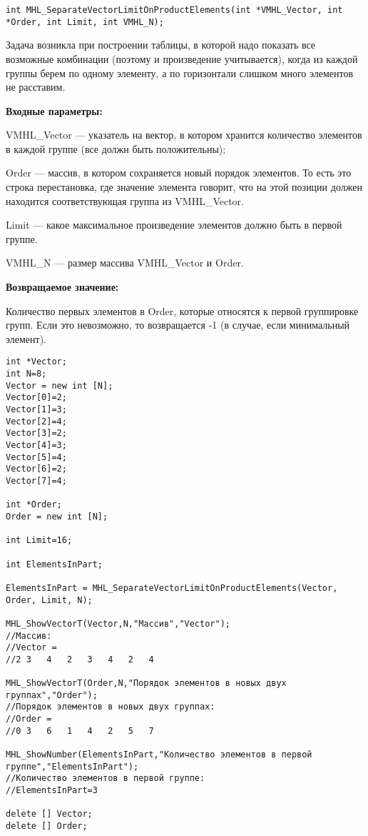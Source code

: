 \documentclass[a4paper,12pt]{article}
\begin{document}
\begin{lstlisting}[label=code_syntax_MHL_SeparateVectorLimitOnProductElements,caption=Синтаксис]
int MHL_SeparateVectorLimitOnProductElements(int *VMHL_Vector, int *Order, int Limit, int VMHL_N);
\end{lstlisting}

Задача возникла при построении таблицы, в которой надо показать все возможные комбинации (поэтому и произведение учитывается), когда из каждой группы берем по одному элементу, а по горизонтали слишком много элементов не расставим.

\textbf{Входные параметры:}  
 
VMHL\_Vector --- указатель на вектор, в котором хранится количество элементов в каждой группе (все должн быть положительны);
 
Order --- массив, в котором сохраняется новый порядок элементов. То есть это строка перестановка, где значение элемента говорит, что на этой позиции должен находится соответствующая группа из VMHL\_Vector.
 
Limit --- какое максимальное произведение элементов должно быть в первой группе.
 
VMHL\_N --- размер массива VMHL\_Vector и Order.
 
\textbf{Возвращаемое значение:}

Количество первых элементов в Order, которые относятся к первой группировке групп. Если это невозможно, то возвращается -1 (в случае, если минимальный элемент).



\begin{lstlisting}[label=code_use_MHL_SeparateVectorLimitOnProductElements,caption=Пример использования]
int *Vector;
int N=8;
Vector = new int [N];
Vector[0]=2;
Vector[1]=3;
Vector[2]=4;
Vector[3]=2;
Vector[4]=3;
Vector[5]=4;
Vector[6]=2;
Vector[7]=4;

int *Order;
Order = new int [N];

int Limit=16;

int ElementsInPart;

ElementsInPart = MHL_SeparateVectorLimitOnProductElements(Vector, Order, Limit, N);

MHL_ShowVectorT(Vector,N,"Массив","Vector");
//Массив:
//Vector =
//2	3	4	2	3	4	2	4

MHL_ShowVectorT(Order,N,"Порядок элементов в новых двух группах","Order");
//Порядок элементов в новых двух группах:
//Order =
//0	3	6	1	4	2	5	7

MHL_ShowNumber(ElementsInPart,"Количество элементов в первой группе","ElementsInPart");
//Количество элементов в первой группе:
//ElementsInPart=3

delete [] Vector;
delete [] Order;
\end{lstlisting}
\end{document}
